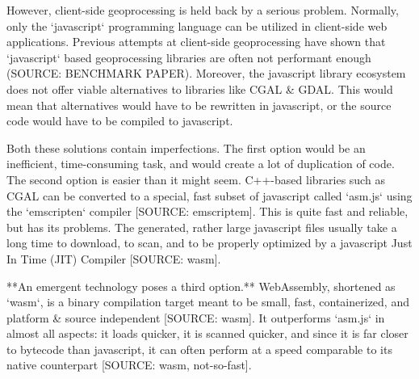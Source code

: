 However, client-side geoprocessing is held back by a serious problem.
Normally, only the `javascript` programming language can be utilized in client-side web applications. Previous attempts at client-side geoprocessing have shown that `javascript` based geoprocessing libraries are often not performant enough (SOURCE: BENCHMARK PAPER). 
Moreover, the javascript library ecosystem does not offer viable alternatives to libraries like CGAL \& GDAL. 
This would mean that alternatives would have to be rewritten in javascript, or the source code would have to be compiled to javascript. 


Both these solutions contain imperfections. The first option would be an inefficient, time-consuming task, and would create a lot of duplication of code. The second option is easier than it might seem. C++-based libraries such as CGAL can be converted to a special, fast subset of javascript called `asm.js` using the `emscripten` compiler [SOURCE: emscriptem]. This is quite fast and reliable, but has its problems. The generated, rather large javascript files usually take a long time to download, to scan, and to be properly optimized by a javascript Just In Time (JIT) Compiler [SOURCE: wasm]. 

**An emergent technology poses a third option.** WebAssembly, shortened as `wasm`, is a binary compilation target meant to be small, fast, containerized, and platform \& source independent [SOURCE: wasm]. It outperforms `asm.js` in almost all aspects: it loads quicker, it is scanned quicker, and since it is far closer to bytecode than javascript, it can often perform at a speed comparable to its native counterpart [SOURCE: wasm, not-so-fast]. 


